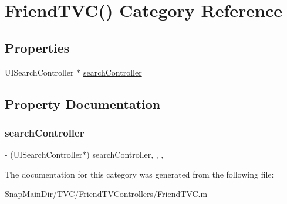\hypertarget{category_friend_t_v_c_07_08}{}\section{Friend\+T\+VC() Category Reference}
\label{category_friend_t_v_c_07_08}
\subsection*{Properties}
\begin{DoxyCompactItemize}
\item 
U\+I\+Search\+Controller $\ast$ \hyperlink{category_friend_t_v_c_07_08_a5e9bd50d167598876cd3651a3115c961}{search\+Controller}
\end{DoxyCompactItemize}


\subsection{Property Documentation}
\hypertarget{category_friend_t_v_c_07_08_a5e9bd50d167598876cd3651a3115c961}{}\label{category_friend_t_v_c_07_08_a5e9bd50d167598876cd3651a3115c961} 
\subsubsection{\texorpdfstring{search\+Controller}{searchController}}
{\footnotesize\ttfamily -\/ (U\+I\+Search\+Controller$\ast$) search\+Controller\hspace{0.3cm}{\ttfamily [read]}, {\ttfamily [write]}, {\ttfamily [nonatomic]}, {\ttfamily [strong]}}



The documentation for this category was generated from the following file\+:\begin{DoxyCompactItemize}
\item 
Snap\+Main\+Dir/\+T\+V\+C/\+Friend\+T\+V\+Controllers/\hyperlink{_friend_t_v_c_8m}{Friend\+T\+V\+C.\+m}\end{DoxyCompactItemize}
